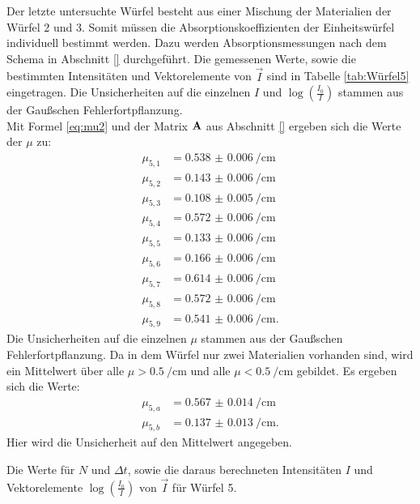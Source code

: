 Der letzte untersuchte Würfel besteht aus einer Mischung der Materialien der Würfel 2 und 3. Somit müssen die Absorptionskoeffizienten der Einheitswürfel individuell bestimmt werden. Dazu werden Absorptionsmessungen nach dem Schema in Abschnitt \ref{} durchgeführt. Die gemessenen Werte, sowie die bestimmten Intensitäten und Vektorelemente von $\vec{I}$ sind in Tabelle \ref{tab:Würfel5} eingetragen. Die Unsicherheiten auf die einzelnen $I$ und $\log\left(\frac{I_0}{I}\right)$ stammen aus der Gaußschen Fehlerfortpflanzung.\\
Mit Formel \eqref{eq:mu2} und der Matrix $\bold{A}$ aus Abschnitt \ref{} ergeben sich die Werte der $\mu$ zu:
\begin{align*}
\mu_{5,1} &= \SI{0.538(6)}{\per\centi\metre}\\
\mu_{5,2} &= \SI{0.143(6)}{\per\centi\metre}\\
\mu_{5,3} &= \SI{0.108(5)}{\per\centi\metre}\\
\mu_{5,4} &= \SI{0.572(6)}{\per\centi\metre}\\
\mu_{5,5} &= \SI{0.133(6)}{\per\centi\metre}\\
\mu_{5,6} &= \SI{0.166(6)}{\per\centi\metre}\\
\mu_{5,7} &= \SI{0.614(6)}{\per\centi\metre}\\
\mu_{5,8} &= \SI{0.572(6)}{\per\centi\metre}\\
\mu_{5,9} &= \SI{0.541(6)}{\per\centi\metre}\text{.}
\end{align*}
Die Unsicherheiten auf die einzelnen $\mu$ stammen aus der Gaußschen Fehlerfortpflanzung.
Da in dem Würfel nur zwei Materialien vorhanden sind, wird ein Mittelwert über alle $\mu >\SI{0.5}{\per\centi\metre}$ und alle $\mu <\SI{0.5}{\per\centi\metre}$ gebildet. Es ergeben sich die Werte:
\begin{align*}
\mu_{5,a} &= \SI{0.567(14)}{\per\centi\metre}\\
\mu_{5,b} &= \SI{0.137(13)}{\per\centi\metre}\text{.}
\end{align*}
Hier wird die Unsicherheit auf den Mittelwert angegeben.

\begin{table}
	\centering
	\caption{Die Werte für $N$ und $\Delta t$, sowie die daraus berechneten Intensitäten $I$ und Vektorelemente $\log\left(\frac{I_0}{I}\right)$ von $\vec{I}$ für Würfel 5.}
	
	\label{tab:Würfel5}
\end{table}
